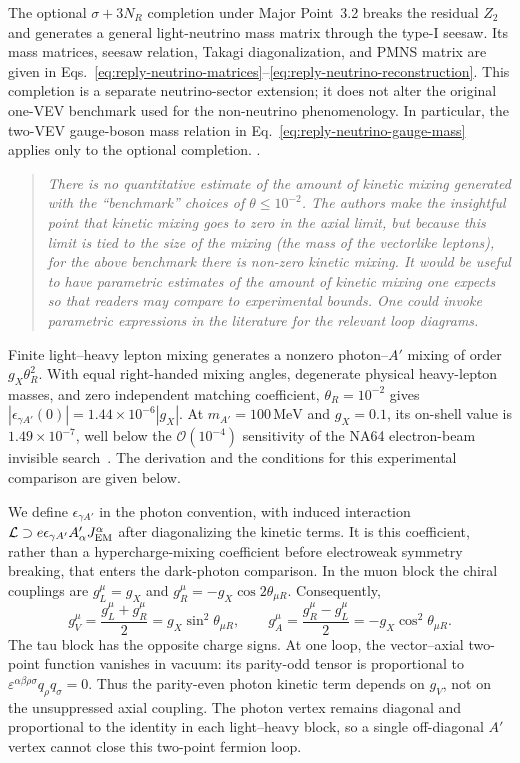 \documentclass[12pt,a4paper]{article}
\begin{document}
The optional \(\sigma+3N_R\) completion under Major Point~3.2 breaks the residual \(Z_2\) and generates a general light-neutrino mass matrix through the type-I seesaw. Its mass matrices, seesaw relation, Takagi diagonalization, and PMNS matrix are given in Eqs.~\eqref{eq:reply-neutrino-matrices}--\eqref{eq:reply-neutrino-reconstruction}. This completion is a separate neutrino-sector extension; it does not alter the original one-VEV benchmark used for the non-neutrino phenomenology. In particular, the two-VEV gauge-boson mass relation in Eq.~\eqref{eq:reply-neutrino-gauge-mass} applies only to the optional completion.\medskip
{}.
\begin{quote}\itshape
There is no quantitative estimate of the amount of kinetic mixing generated with the ``benchmark'' choices of \(\theta\leq10^{-2}\). The authors make the insightful point that kinetic mixing goes to zero in the axial limit, but because this limit is tied to the size of the mixing (the mass of the vectorlike leptons), for the above benchmark there is non-zero kinetic mixing. It would be useful to have parametric estimates of the amount of kinetic mixing one expects so that readers may compare to experimental bounds. One could invoke parametric expressions in the literature for the relevant loop diagrams.
\end{quote}


Finite light--heavy lepton mixing generates a nonzero photon--\(A'\) mixing of order \(g_X\theta_R^2\). With equal right-handed mixing angles, degenerate physical heavy-lepton masses, and zero independent matching coefficient, \(\theta_R=10^{-2}\) gives \(|\epsilon_{\gamma A'}(0)|=1.44\times10^{-6}|g_X|\). At \(m_{A'}=100\,\mathrm{MeV}\) and \(g_X=0.1\), its on-shell value is \(1.49\times10^{-7}\), well below the \(\mathcal O(10^{-4})\) sensitivity of the NA64 electron-beam invisible search~\cite{NA64:2023lightDM}. The derivation and the conditions for this experimental comparison are given below.

\medskip
{}

We define \(\epsilon_{\gamma A'}\) in the photon convention, with induced interaction \(\mathcal L\supset e\epsilon_{\gamma A'}A'_\alpha J_{\rm EM}^\alpha\) after diagonalizing the kinetic terms. It is this coefficient, rather than a hypercharge-mixing coefficient before electroweak symmetry breaking, that enters the dark-photon comparison. In the muon block the chiral couplings are \(g_L^\mu=g_X\) and \(g_R^\mu=-g_X\cos2\theta_{\mu R}\). Consequently,
\[
g_V^\mu=\frac{g_L^\mu+g_R^\mu}{2}=g_X\sin^2\theta_{\mu R},
\qquad
g_A^\mu=\frac{g_R^\mu-g_L^\mu}{2}=-g_X\cos^2\theta_{\mu R}.
\]
The tau block has the opposite charge signs. At one loop, the vector--axial two-point function vanishes in vacuum: its parity-odd tensor is proportional to \(\varepsilon^{\alpha\beta\rho\sigma}q_\rho q_\sigma=0\). Thus the parity-even photon kinetic term depends on \(g_V\), not on the unsuppressed axial coupling. The photon vertex remains diagonal and proportional to the identity in each light--heavy block, so a single off-diagonal \(A'\) vertex cannot close this two-point fermion loop.
\end{document}
